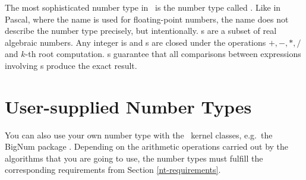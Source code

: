 The most sophisticated number type in \leda\ is the number type called
. Like in Pascal, where the name  is used for
floating-point numbers, the name  does not describe the
number type precisely, but intentionally.  
s are a subset of real algebraic
numbers.  Any integer is  and s are closed under
the operations $+,-,*,/$ and $k$-th root computation. 
s guarantee that
all comparisons between expressions involving s produce the
exact result.


\section{User-supplied Number Types}

You can also use your own number type with the \cgal\ kernel
classes, e.g.\  the {\sc BigNum} package \cite{svh-bpepa-89}.
Depending on the arithmetic operations carried out by the algorithms
that you are going to use, the number types must fulfill the
corresponding requirements from Section \ref{nt-requirements}. 

